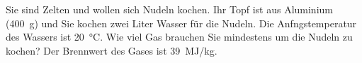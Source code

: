 
\begin{aufgabe}
Sie sind Zelten und wollen sich Nudeln kochen.
Ihr Topf ist aus Aluminium (\SI{400}{g}) und Sie kochen zwei Liter Wasser für die Nudeln.
Die Anfngstemperatur des Wassers ist \SI{20}{\celsius}.
Wie viel Gas brauchen Sie mindestens um die Nudeln zu kochen?
Der Brennwert des Gases ist \SI{39}{MJ/kg}. 

\begin{loesung}
\end{loesung}

\end{aufgabe}

